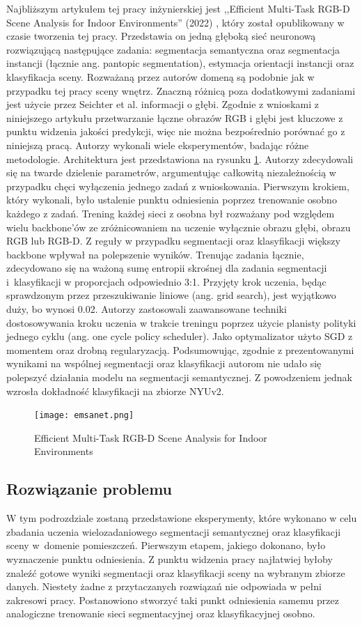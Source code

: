 Najbliższym artykułem tej pracy inżynierskiej jest ,,Efficient Multi-Task RGB-D Scene Analysis for Indoor Environments'' (2022) \cite{9892852}, który został opublikowany w czasie tworzenia tej pracy. Przedstawia on jedną głęboką sieć neuronową rozwiązującą następujące zadania: segmentacja semantyczna oraz segmentacja instancji (łącznie ang. pantopic segmentation), estymacja orientacji instancji oraz klasyfikacja sceny. Rozważaną przez autorów domeną są podobnie jak w przypadku tej pracy sceny wnętrz. Znaczną różnicą poza dodatkowymi zadaniami jest użycie przez Seichter et al. informacji o głębi. Zgodnie z wnioskami z niniejszego artykułu przetwarzanie łączne obrazów RGB i głębi jest kluczowe z punktu widzenia jakości predykcji, więc nie można bezpośrednio porównać go z niniejszą pracą. Autorzy wykonali wiele eksperymentów, badając różne metodologie. Architektura jest przedstawiona na rysunku \ref{fig:emsanet}. Autorzy zdecydowali się na twarde dzielenie parametrów, argumentując całkowitą niezależnością w przypadku chęci wyłączenia jednego zadań z wnioskowania. Pierwszym krokiem, który wykonali, było ustalenie punktu odniesienia poprzez trenowanie osobno każdego z zadań. Trening każdej sieci z osobna był rozważany pod względem wielu backbone'ów ze zróżnicowaniem na uczenie wyłącznie obrazu głębi, obrazu RGB lub RGB-D. Z reguły w przypadku segmentacji oraz klasyfikacji większy backbone wpływał na polepszenie wyników. Trenując zadania łącznie, zdecydowano się na ważoną sumę entropii skrośnej dla zadania segmentacji i~klasyfikacji w proporcjach odpowiednio 3:1. Przyjęty krok uczenia, będąc sprawdzonym przez przeszukiwanie liniowe (ang. grid search), jest wyjątkowo duży, bo wynosi 0.02. Autorzy zastosowali zaawansowane techniki dostosowywania kroku uczenia w trakcie treningu poprzez użycie planisty polityki jednego cyklu (ang. one cycle policy scheduler). Jako optymalizator użyto SGD z momentem oraz drobną regularyzacją. Podsumowując, zgodnie z prezentowanymi wynikami na wspólnej segmentacji oraz klasyfikacji autorom nie udało się polepszyć działania modelu na segmentacji semantycznej. Z powodzeniem jednak wzrosła dokładność klasyfikacji na zbiorze NYUv2.

\begin{figure}[ht!]
    \centering
    \texttt{[image: emsanet.png]}
    \caption{Efficient Multi-Task RGB-D Scene Analysis for Indoor Environments \cite{9892852}}
    \label{fig:emsanet}
\end{figure}


\subsection{Rozwiązanie problemu}
W tym podrozdziale zostaną przedstawione eksperymenty, które wykonano w celu zbadania uczenia wielozadaniowego segmentacji semantycznej oraz klasyfikacji sceny w~domenie pomieszczeń. Pierwszym etapem, jakiego dokonano, było wyznaczenie punktu odniesienia. Z punktu widzenia pracy najłatwiej byłoby znaleźć gotowe wyniki segmentacji oraz klasyfikacji sceny na wybranym zbiorze danych. Niestety żadne z przytaczanych rozwiązań nie odpowiada w pełni zakresowi pracy. Postanowiono stworzyć taki punkt odniesienia samemu przez analogiczne trenowanie sieci segmentacyjnej oraz klasyfikacyjnej osobno.

